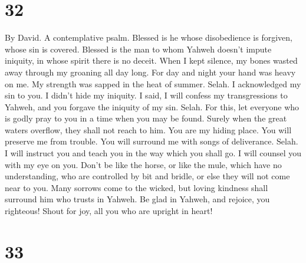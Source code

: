 \hypertarget{section-31}{%
\section{32}\label{section-31}}

By David. A contemplative psalm.  Blessed is he whose
disobedience is forgiven, whose sin is covered.  Blessed is
the man to whom Yahweh doesn't impute iniquity, in whose spirit there is
no deceit.  When I kept silence, my bones wasted away
through my groaning all day long.  For day and night your
hand was heavy on me. My strength was sapped in the heat of summer.
Selah.  I acknowledged my sin to you. I didn't hide my
iniquity. I said, I will confess my transgressions to Yahweh, and you
forgave the iniquity of my sin. Selah.  For this, let
everyone who is godly pray to you in a time when you may be found.
Surely when the great waters overflow, they shall not reach to him.
 You are my hiding place. You will preserve me from trouble.
You will surround me with songs of deliverance. Selah.  I
will instruct you and teach you in the way which you shall go. I will
counsel you with my eye on you.  Don't be like the horse, or
like the mule, which have no understanding, who are controlled by bit
and bridle, or else they will not come near to you.  Many
sorrows come to the wicked, but loving kindness shall surround him who
trusts in Yahweh.  Be glad in Yahweh, and rejoice, you
righteous! Shout for joy, all you who are upright in heart!

\hypertarget{section-32}{%
\section{33}\label{section-32}}


